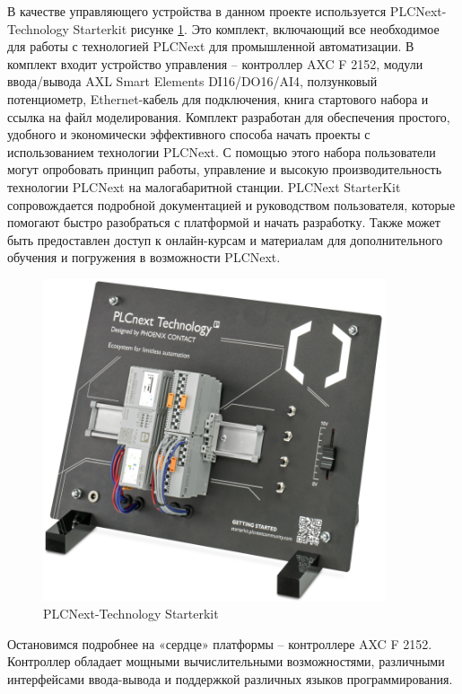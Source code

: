 В качестве управляющего устройства в данном проекте используется PLCNext-Technology Starterkit  рисунке \ref{fig:ACXF2152}. Это комплект, включающий все необходимое для работы с технологией PLCNext для промышленной автоматизации. В комплект входит устройство управления {--} контроллер AXC F 2152, модули ввода/вывода AXL Smart Elements DI16/DO16/AI4, ползунковый потенциометр, Ethernet-кабель для подключения, книга стартового набора и ссылка на файл моделирования. Комплект разработан для обеспечения простого, удобного и экономически эффективного способа начать проекты с использованием технологии PLCNext. С помощью этого набора пользователи могут опробовать принцип работы, управление и высокую производительность технологии PLCNext на малогабаритной станции. PLCNext StarterKit сопровождается подробной документацией и руководством пользователя, которые помогают быстро разобраться с платформой и начать разработку. Также может быть предоставлен доступ к онлайн-курсам и материалам для дополнительного обучения и погружения в возможности PLCNext.

\begin{figure}[H]
    \centering
    \includegraphics[width=0.9\textwidth]{images/chapter_4/pclnext_x.png}
    \caption{PLCNext-Technology Starterkit}
    \label{fig:ACXF2152}
\end{figure}

Остановимся подробнее на «сердце» платформы {--} контроллере AXC F 2152. Контроллер обладает мощными вычислительными возможностями, различными интерфейсами ввода-вывода и поддержкой различных языков программирования.

